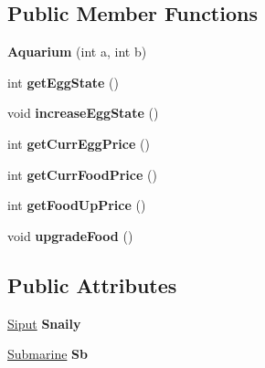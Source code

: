 \subsection*{Public Member Functions}
\begin{DoxyCompactItemize}
\item 
\mbox{\label{class_aquarium_a3cff2b1a50a561f4f231145d44282bcc}} 
{\bfseries Aquarium} (int a, int b)
\item 
\mbox{\label{class_aquarium_a7d855672531a2da9655bf42fbd3d3dcc}} 
int {\bfseries get\+Egg\+State} ()
\item 
\mbox{\label{class_aquarium_ac48b93474730e4ebbb69207e8e875760}} 
void {\bfseries increase\+Egg\+State} ()
\item 
\mbox{\label{class_aquarium_ac030a82bcd46ea6b8d7abcb6acfb0481}} 
int {\bfseries get\+Curr\+Egg\+Price} ()
\item 
\mbox{\label{class_aquarium_a000a4fa85f8fde473e2df1b6639da9f5}} 
int {\bfseries get\+Curr\+Food\+Price} ()
\item 
\mbox{\label{class_aquarium_ada38a4e23a562f578e99dcbfd29ccc9d}} 
int {\bfseries get\+Food\+Up\+Price} ()
\item 
\mbox{\label{class_aquarium_ad13cadde72f6ba660ce6807690d6ee67}} 
void {\bfseries upgrade\+Food} ()
\end{DoxyCompactItemize}
\subsection*{Public Attributes}
\begin{DoxyCompactItemize}
\item 
\mbox{\label{class_aquarium_aba49eb1d68ec99219e851c9241cdf361}} 
\mbox{\hyperlink{class_siput}{Siput}} {\bfseries Snaily}
\item 
\mbox{\label{class_aquarium_a8ff32a3dd96479a8095fd7103840cec2}} 
\mbox{\hyperlink{class_submarine}{Submarine}} {\bfseries Sb}
\end{DoxyCompactItemize}
